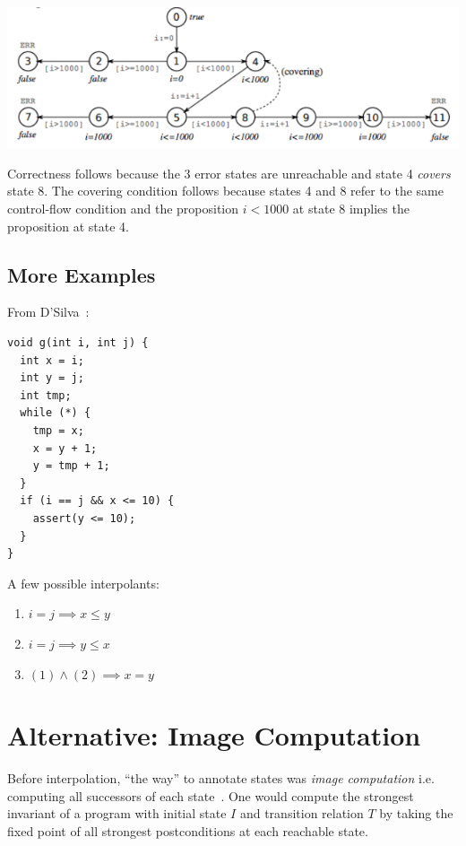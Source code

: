 \documentclass{article}
\begin{document}
\begin{center}
  \includegraphics[scale=0.5]{src/example-tree.png}
\end{center}

Correctness follows because the 3 error states are unreachable and state 4 \emph{covers}
 state 8.
The covering condition follows because states 4 and 8 refer to the same control-flow
 condition and the proposition $i < 1000$ at state 8 implies the proposition at
 state 4.

\subsection{More Examples}

From D'Silva~\cite{d-nyu-2015}:

\begin{lstlisting}
void g(int i, int j) {
  int x = i;
  int y = j;
  int tmp;
  while (*) {
    tmp = x;
    x = y + 1;
    y = tmp + 1;
  }
  if (i == j && x <= 10) {
    assert(y <= 10);
  }
}
\end{lstlisting}

A few possible interpolants:
\begin{enumerate}
\item $i = j \implies x \le y$
\item $i = j \implies y \le x$
\item $(1) \wedge (2) \implies x = y$
\end{enumerate}


\section{Alternative: Image Computation}

Before interpolation, ``the way'' to annotate states was \emph{image computation}
 i.e. computing all successors of each state~\cite{m-tacas-2005}.
One would compute the strongest invariant of a program with initial state $I$
 and transition relation $T$ by taking the fixed point of all strongest
 postconditions at each reachable state.
\end{document}
